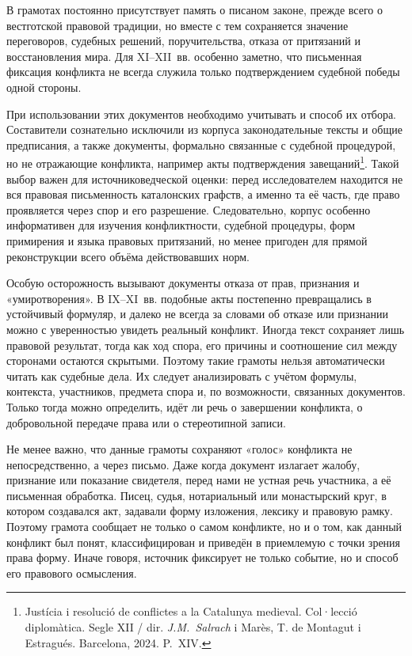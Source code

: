 В грамотах постоянно присутствует память о писаном законе, прежде всего о вестготской правовой традиции, но вместе с тем сохраняется значение переговоров, судебных решений, поручительства, отказа от притязаний и восстановления мира. Для XI--XII~вв. особенно заметно, что письменная фиксация конфликта не всегда служила только подтверждением судебной победы одной стороны.

При использовании этих документов необходимо учитывать и способ их отбора. Составители сознательно исключили из корпуса законодательные тексты и общие предписания, а также документы, формально связанные с судебной процедурой, но не отражающие конфликта, например акты подтверждения завещаний\footnote{Justícia i resolució de conflictes a la Catalunya medieval. Col·lecció diplomàtica. Segle XII / dir. \emph{J.M.~Salrach} i Marès, T. de Montagut i Estragués. Barcelona, 2024. P.~XIV.}. Такой выбор важен для источниковедческой оценки: перед исследователем находится не вся правовая письменность каталонских графств, а именно та её часть, где право проявляется через спор и его разрешение. Следовательно, корпус особенно информативен для изучения конфликтности, судебной процедуры, форм примирения и языка правовых притязаний, но менее пригоден для прямой реконструкции всего объёма действовавших норм.

Особую осторожность вызывают документы отказа от прав, признания и «умиротворения». В IX--XI~вв. подобные акты постепенно превращались в устойчивый формуляр, и далеко не всегда за словами об отказе или признании можно с уверенностью увидеть реальный конфликт. Иногда текст сохраняет лишь правовой результат, тогда как ход спора, его причины и соотношение сил между сторонами остаются скрытыми. Поэтому такие грамоты нельзя автоматически читать как судебные дела. Их следует анализировать с учётом формулы, контекста, участников, предмета спора и, по возможности, связанных документов. Только тогда можно определить, идёт ли речь о завершении конфликта, о добровольной передаче права или о стереотипной записи.

Не менее важно, что данные грамоты сохраняют «голос» конфликта не непосредственно, а через письмо. Даже когда документ излагает жалобу, признание или показание свидетеля, перед нами не устная речь участника, а её письменная обработка. Писец, судья, нотариальный или монастырский круг, в котором создавался акт, задавали форму изложения, лексику и правовую рамку. Поэтому грамота сообщает не только о самом конфликте, но и о том, как данный конфликт был понят, классифицирован и приведён в приемлемую с точки зрения права форму. Иначе говоря, источник фиксирует не только событие, но и способ его правового осмысления.


